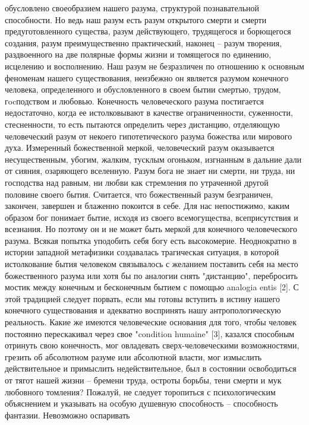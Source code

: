 \documentclass[12pt]{article}
\begin{document}
обусловлено своеобразием нашего разума, структурой познавательной способности. Но ведь наш разум есть
разум  открытого  смерти  и  смерти  предуготовленного  существа,  разум  действующего,  трудящегося  и
борющегося создания, разум преимущественно практический, наконец -- разум творения, раздвоенного на две
полярные формы жизни и томящегося по единению, исцелению и восполнению. Наш разум не безразличен по
отношению  к  основным  феноменам  нашего  существования,  неизбежно  он  является  разумом  конечного
человека,  определенного  и  обусловленного  в  своем  бытии  смертью,  трудом,  гocподством  и  любовью.
Конечность  человеческого  разума  постигается  недостаточно,  когда  ее  истолковывают  в  качестве
ограниченности,  суженности,  стесненности,  то  есть  пытаются  определить  через  дистанцию,  отделяющую
человеческий  разум  от  некоего  гипотетического  разума  божества  или  мирового  духа.  Измеренный
божественной меркой, человеческий разум оказывается несущественным, убогим, жалким, тусклым огоньком,
изгнанным в дальние дали от сияния, озаряющего вселенную. Разум бога не знает ни смерти, ни труда, ни
господства над равным, ни любви как стремления по утраченной другой половине своего бытия. Считается, что
божественный разум безграничен, закончен, завершен и блаженно покоится в себе. Для нас непостижимо,
каким образом бог понимает бытие, исходя из своего всемогущества, всеприсутствия и всезнания. Но поэтому
он и не может быть меркой для конечного человеческого разума. Всякая попытка уподобить себя богу есть
высокомерие.  Неоднократно  в  истории  западной  метафизики  создавалась  трагическая  ситуация,  в  которой
истолкование бытия человеком связывалось с желанием поставить себя на место божественного разума или хотя
бы по аналогии снять "дистанцию", перебросить мостик между конечным и бесконечным бытием с помощью
analogia entis [2]. С этой традицией следует порвать, если мы готовы вступить в истину нашего конечного
существования и адекватно воспринять нашу антропологическую реальность.
Какие  же  имеются  человеческие  основания  для  того,  чтобы  человек  постоянно  перескакивал  через  свое
"condition humaine" [3], казался способным отринуть свою конечность, мог овладевать сверх-человеческими
возможностями,  грезить  об  абсолютном  разуме  или  абсолютной  власти,  мог  измыслить  действительное  и
примыслить недействительное, был в состоянии освободиться от тягот нашей жизни -- бремени труда, остроты
борьбы,  тени  смерти  и  мук  любовного  томления?  Пожалуй,  не  следует  торопиться  с  психологическим
объяснением и указывать на особую душевную способность -- способность фантазии. Невозможно оспаривать
\end{document}
